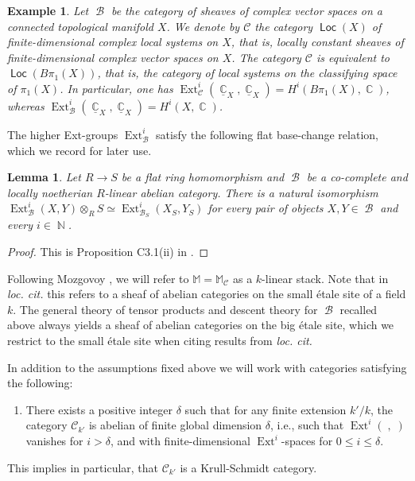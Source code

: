 \documentclass{article}
\DeclareMathOperator{\Cb}{\mathbb{C}}
\newcommand{\Cc}{\mathcal{C}}
\DeclareMathOperator{\Nb}{\mathbb{N}}
\DeclareMathOperator{\Loc}{\mathsf{Loc}}
\DeclareMathOperator{\Bc}{\mathcal{B}}
\newcommand{\BM}{{\mathbb{M}}}
\DeclareMathOperator{\Ext}{Ext}
\theoremstyle{definition}
\theoremstyle{plain}
\newtheorem{lemma}[definition]{Lemma}
\newtheorem{example}[definition]{Example}
\begin{document}
\begin{example}
Let $\Bc$ be the category of sheaves of complex vector spaces on a connected topological manifold $X$. We denote by $\Cc$ the category $\Loc(X)$ of finite-dimensional complex local systems on $X$, that is, locally constant sheaves of finite-dimensional complex vector spaces on $X$. The category $\Cc$ is equivalent to $\Loc(B\pi_1(X))$, that is, the category of local systems on the classifying space of $\pi_1(X)$. In particular, one has $\Ext^i_{\Cc}(\underline{\Cb}_X,\underline{\Cb}_X) = H^i(B\pi_1(X),\Cb)$, whereas $\Ext^i_{\Bc}(\underline{\Cb}_X,\underline{\Cb}_X) = H^i(X,\Cb)$.
\end{example}

The higher Ext-groups $\Ext^i_{\Bc}$ satisfy the following flat base-change relation, which we record for later use.

\begin{lemma}\label{lemma:base-change}
Let $R \to S$ be a flat ring homomorphism and $\Bc$ be a co-complete and locally noetherian $R$-linear abelian category. There is a natural isomorphism $\Ext^i_{\Bc}(X,Y) \otimes_R S \simeq \Ext^i_{\Bc_S}(X_S,Y_S)$ for every pair of objects $X,Y \in \Bc$ and every $i \in \Nb$.
\end{lemma}
\begin{proof}
This is Proposition C3.1(ii) in \cite{AZ01}.
\end{proof}

Following Mozgovoy \cite{Mo19}, we will refer to $\BM=\BM_{\Cc}$ as a $k$-linear stack. Note that in \emph{loc. cit.} this refers to a sheaf of abelian categories on the small \'etale site of a field $k$. The general theory of tensor products and descent theory for $\Bc$ recalled above always yields a sheaf of abelian categories on the big \'etale site, which we restrict to the small \'etale site when citing results from \emph{loc. cit.} 

In addition to the assumptions fixed above we will work with categories satisfying the following:

\begin{enumerate}
    \item There exists a positive integer $\delta$ such that for any finite extension $k'/k$, the category $\Cc_{k'}$ is abelian of finite global dimension $\delta$, i.e., such that $\Ext^i(\;,\;)$ vanishes for $i>\delta$, and with finite-dimensional $\Ext^i$-spaces for $0 \leq i \leq \delta$.
        
\end{enumerate}
This  implies in particular, that $\Cc_{k'}$ is a Krull-Schmidt category. 
\end{document}

